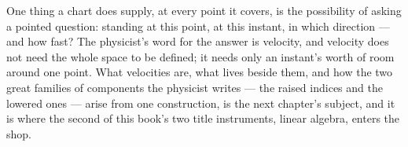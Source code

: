 One thing a chart does supply, at every point it covers, is the possibility
of asking a pointed question: standing at this point, at this instant, in
which direction --- and how fast? The physicist's word for the answer is
velocity, and velocity does not need the whole space to be defined; it
needs only an instant's worth of room around one point. What velocities are,
what lives beside them, and how the two great families of components the
physicist writes --- the raised indices and the lowered ones --- arise from
one construction, is the next chapter's subject, and it is where the second
of this book's two title instruments, linear algebra, enters the shop.
